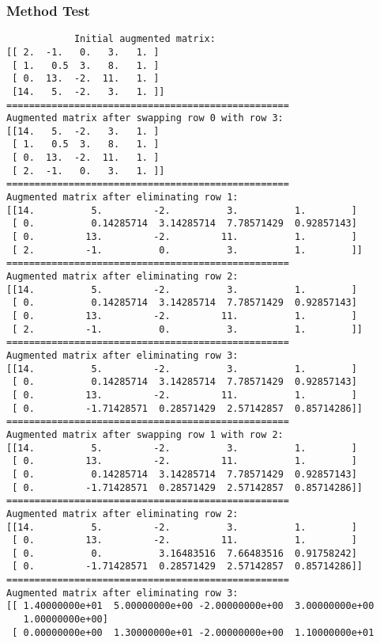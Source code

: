 \documentclass{article}
\begin{document}
        \subsubsection{Method Test}
        \begin{lstlisting}
            Initial augmented matrix:
[[ 2.  -1.   0.   3.   1. ]
 [ 1.   0.5  3.   8.   1. ]
 [ 0.  13.  -2.  11.   1. ]
 [14.   5.  -2.   3.   1. ]]
==================================================
Augmented matrix after swapping row 0 with row 3:
[[14.   5.  -2.   3.   1. ]
 [ 1.   0.5  3.   8.   1. ]
 [ 0.  13.  -2.  11.   1. ]
 [ 2.  -1.   0.   3.   1. ]]
==================================================
Augmented matrix after eliminating row 1:
[[14.          5.         -2.          3.          1.        ]
 [ 0.          0.14285714  3.14285714  7.78571429  0.92857143]
 [ 0.         13.         -2.         11.          1.        ]
 [ 2.         -1.          0.          3.          1.        ]]
==================================================
Augmented matrix after eliminating row 2:
[[14.          5.         -2.          3.          1.        ]
 [ 0.          0.14285714  3.14285714  7.78571429  0.92857143]
 [ 0.         13.         -2.         11.          1.        ]
 [ 2.         -1.          0.          3.          1.        ]]
==================================================
Augmented matrix after eliminating row 3:
[[14.          5.         -2.          3.          1.        ]
 [ 0.          0.14285714  3.14285714  7.78571429  0.92857143]
 [ 0.         13.         -2.         11.          1.        ]
 [ 0.         -1.71428571  0.28571429  2.57142857  0.85714286]]
==================================================
Augmented matrix after swapping row 1 with row 2:
[[14.          5.         -2.          3.          1.        ]
 [ 0.         13.         -2.         11.          1.        ]
 [ 0.          0.14285714  3.14285714  7.78571429  0.92857143]
 [ 0.         -1.71428571  0.28571429  2.57142857  0.85714286]]
==================================================
Augmented matrix after eliminating row 2:
[[14.          5.         -2.          3.          1.        ]
 [ 0.         13.         -2.         11.          1.        ]
 [ 0.          0.          3.16483516  7.66483516  0.91758242]
 [ 0.         -1.71428571  0.28571429  2.57142857  0.85714286]]
==================================================
Augmented matrix after eliminating row 3:
[[ 1.40000000e+01  5.00000000e+00 -2.00000000e+00  3.00000000e+00
   1.00000000e+00]
 [ 0.00000000e+00  1.30000000e+01 -2.00000000e+00  1.10000000e+01

\end{lstlisting}
\end{document}
